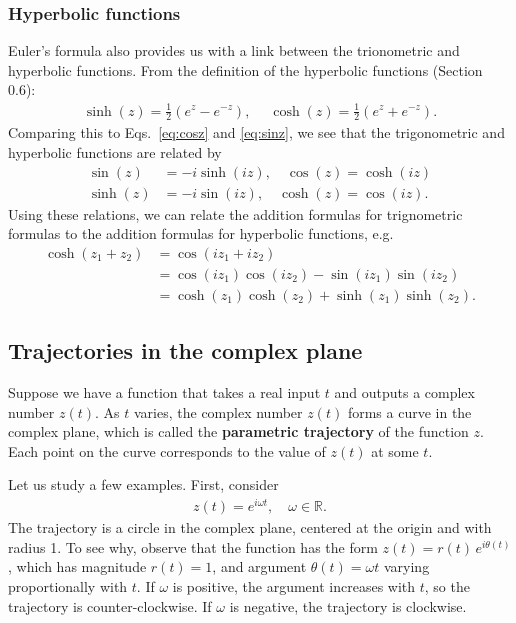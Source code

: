 \documentclass[10pt,a4paper]{article}
\begin{document}
\subsubsection{Hyperbolic functions}
\label{hyperbolic-functions}

Euler's formula also provides us with a link between the trionometric
and hyperbolic functions.  From the definition of the hyperbolic
functions (Section 0.6):
\begin{align}
  \sinh(z) = \frac{1}{2}\left(e^{z} - e^{-z}\right), \quad\; \cosh(z) = \frac{1}{2}\left(e^{z} + e^{-z}\right).
\end{align}
Comparing this to Eqs.~\eqref{eq:cosz} and \eqref{eq:sinz}, we see
that the trigonometric and hyperbolic functions are related by
\begin{align}
  \sin(z) &= -i \sinh(iz), \quad \cos(z) = \cosh(iz) \\
  \sinh(z) &= -i \sin(iz), \quad \cosh(z) = \cos(iz).
\end{align}
Using these relations, we can relate the addition formulas for
trignometric formulas to the addition formulas for hyperbolic
functions, e.g.
\begin{align}
  \cosh(z_1+z_2) &= \cos(iz_1 + iz_2) \\
  &= \cos(iz_1)\cos(iz_2) - \sin(iz_1)\sin(iz_2) \\
  &= \cosh(z_1)\cosh(z_2) + \sinh(z_1)\sinh(z_2).
\end{align}

\subsection{Trajectories in the complex plane}
\label{trajectories-in-the-complex-plane}

Suppose we have a function that takes a real input $t$ and outputs a
complex number $z(t)$. As $t$ varies, the complex number $z(t)$ forms
a curve in the complex plane, which is called the \textbf{parametric
  trajectory} of the function $z$. Each point on the curve corresponds
to the value of $z(t)$ at some $t$.

Let us study a few examples. First, consider
\begin{align}
  z(t) = e^{i\omega t}, \quad \omega \in \mathbb{R}.
\end{align}
The trajectory is a circle in the complex plane, centered at the
origin and with radius 1. To see why, observe that the function has
the form $z(t) = r(t)\,e^{i\theta(t)}$, which has magnitude $r(t) =
1$, and argument $\theta(t) = \omega t$ varying proportionally with
$t$. If $\omega$ is positive, the argument increases with $t$, so the
trajectory is counter-clockwise. If $\omega$ is negative, the
trajectory is clockwise.
\end{document}
